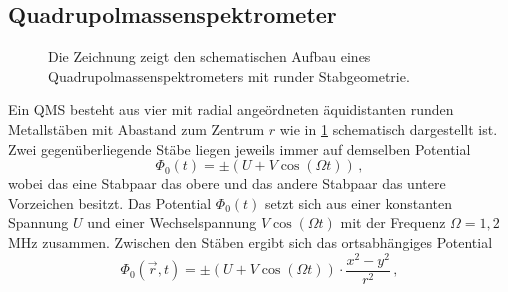 \subsection{Quadrupolmassenspektrometer}\label{subsec:quadrupolmassenspektrometer}
\begin{figure}[h]
 	\centering
	\caption[Quadrupolmassenspektrometer,
	schematisch]{Die Zeichnung zeigt den schematischen Aufbau eines
	Quadrupolmassenspektrometers mit runder
	Stabgeometrie.}\label{fig:quadrupolmassenspektrometer}
\end{figure}
Ein QMS besteht aus vier mit radial angeördneten äquidistanten runden
Metallstäben mit Abastand zum Zentrum $r$ wie in
\ref{fig:quadrupolmassenspektrometer} schematisch dargestellt ist. Zwei gegenüberliegende Stäbe liegen jeweils immer auf demselben Potential
\begin{equation}\label{eq:qms_potential_0}
	\Phi_0(t)=\pm\left(U+V\cos{(\Omega t)}\right)\,,
\end{equation}
wobei das eine Stabpaar das obere und das andere Stabpaar das untere Vorzeichen
besitzt. Das Potential $\Phi_0(t)$ setzt sich aus einer konstanten Spannung $U$
und einer Wechselspannung $V\cos{(\Omega t)}$ mit der Frequenz $\Omega=1,2\,$MHz
zusammen. Zwischen den Stäben ergibt sich das ortsabhängiges Potential
\begin{equation}\label{eq:qms_potential_ort}
	\Phi_0(\vec{r},t)=\pm\left(U+V\cos{(\Omega
	t)}\right)\cdot\frac{x^2-y^2}{r^2}\,,
\end{equation}
